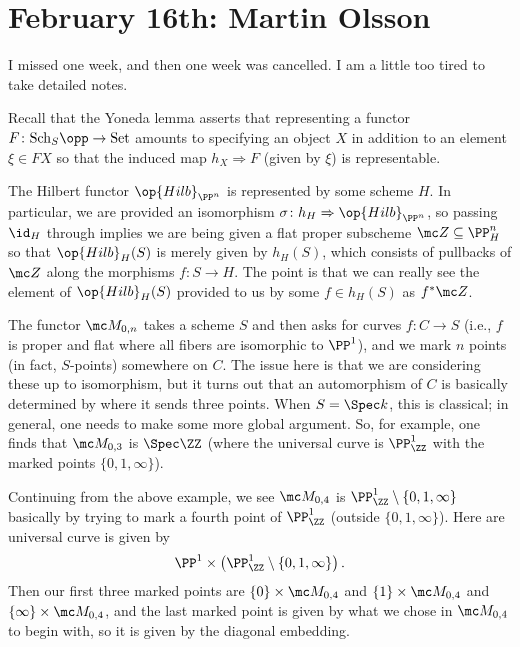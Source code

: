 \documentclass{article}
\begin{document}
\section{February 16th: Martin Olsson}
I missed one week, and then one week was cancelled. I am a little too tired to take detailed notes.
\begin{remark}
	Recall that the Yoneda lemma asserts that representing a functor $F\colon\mathrm{Sch}_S\opp\to\mathrm{Set}$ amounts to specifying an object $X$ in addition to an element $\xi\in FX$ so that the induced map $h_X\Rightarrow F$ (given by $\xi$) is representable.
\end{remark}
\begin{example}
	The Hilbert functor $\op{Hilb}_{\PP^n}$ is represented by some scheme $H$. In particular, we are provided an isomorphism $\sigma\colon h_H\Rightarrow\op{Hilb}_{\PP^n}$, so passing $\id_H$ through implies we are being given a flat proper subscheme $\mc Z\subseteq\PP^n_H$ so that $\op{Hilb}_H(S)$ is merely given by $h_H(S)$, which consists of pullbacks of $\mc Z$ along the morphisms $f\colon S\to H$. The point is that we can really see the element of $\op{Hilb}_H(S)$ provided to us by some $f\in h_H(S)$ as $f^*\mc Z$.
\end{example}
\begin{example}
	The functor $\mc M_{0,n}$ takes a scheme $S$ and then asks for curves $f\colon C\to S$ (i.e., $f$ is proper and flat where all fibers are isomorphic to $\PP^1$), and we mark $n$ points (in fact, $S$-points) somewhere on $C$. The issue here is that we are considering these up to isomorphism, but it turns out that an automorphism of $C$ is basically determined by where it sends three points. When $S=\Spec k$, this is classical; in general, one needs to make some more global argument. So, for example, one finds that $\mc M_{0,3}$ is $\Spec\ZZ$ (where the universal curve is $\PP^1_\ZZ$ with the marked points $\{0,1,\infty\}$).
\end{example}
\begin{example}
	Continuing from the above example, we see $\mc M_{0,4}$ is $\PP^1_\ZZ\setminus\{0,1,\infty\}$ basically by trying to mark a fourth point of $\PP^1_\ZZ$ (outside $\{0,1,\infty\}$). Here are universal curve is given by
	\[\PP^1\times\left(\PP^1_\ZZ\setminus\{0,1,\infty\}\right).\]
	Then our first three marked points are $\{0\}\times\mc M_{0,4}$ and $\{1\}\times\mc M_{0,4}$ and $\{\infty\}\times\mc M_{0,4}$, and the last marked point is given by what we chose in $\mc M_{0,4}$ to begin with, so it is given by the diagonal embedding.
\end{example}
\end{document}
